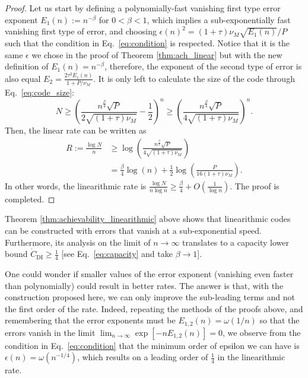 \documentclass[10pt,conference]{IEEEtran}
\newcommand{\1}{\mathds{1}}
\begin{document}
\begin{proof}
Let us start by defining a polynomially-fast vanishing first type error exponent $E_1(n):=n^{-\beta}$ for $0<\beta<1$, which implies a sub-exponentially fast vanishing first type of error, and choosing $\epsilon(n)^2=(1+\tau)\nu_M\sqrt{E_1(n)}/P$ such that the condition in Eq.~\eqref{eq:condition} is respected. Notice that it is the same $\epsilon$ we chose in the proof of Theorem \ref{thm:ach_linear} but with the new definition of $E_1(n)=n^{-\beta}$, therefore, the exponent of the second type of error is also equal $E_2=\frac{2\tau^2E_1(n)}{1+P/\nu_M}$. It is only left to calculate the size of the code through Eq.~\eqref{eq:code_size}:
\[
N\geq\left(\frac{n^{\frac{\beta}{4}}\sqrt{P}}{2\sqrt{(1+\tau)\nu_M}}-\frac12\right)^n\geq\left(\frac{n^{\frac{\beta}{4}}\sqrt{P}}{4\sqrt{(1+\tau)\nu_M}}\right)^n.
\]
Then, the linear rate can be written as 
\[
\begin{split}
R:=\frac{\log N}{n}&\geq\log\left(\frac{n^{\frac{\beta}{4}}\sqrt{P}}{4\sqrt{(1+\tau)\nu_M}}\right)\\   
&=\frac{\beta}{4}\log(n)+\frac12\log\left(\frac{P}{16(1+\tau)\nu_M}\right).
\end{split}
\]
In other words, the linearithmic rate is $\frac{\log N}{n\log n}\geq\frac{\beta}{4}+O(\frac{1}{\log n})$. The proof is completed.
\end{proof}

Theorem \ref{thm:achievability_linearithmic} above shows that linearithmic codes can be constructed with errors that vanish at a sub-exponential speed. 
Furthermore, its analysis on the limit of $n\to\infty$ translates to a capacity lower bound $\dot{C}_{\text{DI}}\geq\frac14$ [see Eq.~\eqref{eq:capacity} and take $\beta\to1$]. 

One could wonder if smaller values of the error exponent (vanishing even faster than polynomially) could result in better rates. The answer is that, with the construction proposed here, we can only improve the sub-leading terms and not the first order of the rate. Indeed, repeating the methods of the proofs above, and remembering that the error exponents must be $E_{1,2}(n)=\omega(1/n)$ so that the errors vanish in the limit $\lim_{n\to\infty}\exp[-nE_{1,2}(n)]=0$, we observe from the condition in Eq.~\eqref{eq:condition} that the minimum order of epsilon we can have is $\epsilon(n)=\omega(n^{-1/4})$, which results on a leading order of $\frac14$ in the linearithmic rate. 
\end{document}
